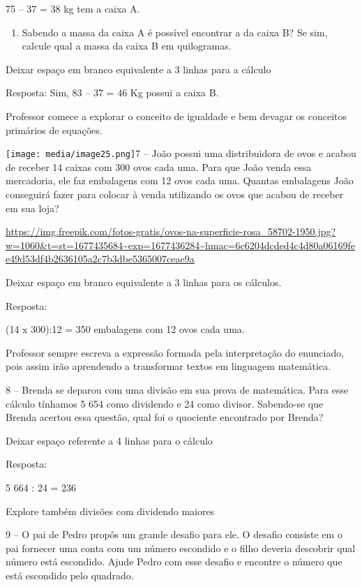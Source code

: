 75 -- 37 = 38 kg tem a caixa A.

\begin{enumerate}
\def\labelenumi{\alph{enumi})}
\item
  Sabendo a massa da caixa A é possível encontrar a da caixa B? Se sim,
  calcule qual a massa da caixa B em quilogramas.
\end{enumerate}

Deixar espaço em branco equivalente a 3 linhas para a cálculo

Resposta: Sim, 83 -- 37 = 46 Kg possui a caixa B.

Professor comece a explorar o conceito de igualdade e bem devagar os
conceitos primários de equações.

\texttt{[image: media/image25.png]}7
-- João possui uma distribuidora de ovos e acabou de receber 14 caixas
com 300 ovos cada uma. Para que João venda essa mercadoria, ele faz
embalagens com 12 ovos cada uma. Quantas embalagens João conseguirá
fazer para colocar à venda utilizando os ovos que acabou de receber em
sua loja?

\url{https://img.freepik.com/fotos-gratis/ovos-na-superficie-rosa_58702-1950.jpg?w=1060\&t=st=1677435684~exp=1677436284~hmac=6c6204dcded4c4d80a06169fee49d53df4b2636105a2c7b3dbe5365007ceae9a}

Deixar espaço em branco equivalente a 3 linhas para os cálculos.

Resposta:

(14 x 300):12 = 350 embalagens com 12 ovos cada uma.

Professor sempre escreva a expressão formada pela interpretação do
enunciado, pois assim irão aprendendo a transformar textos em linguagem
matemática.

8 -- Brenda se deparou com uma divisão em sua prova de matemática. Para
esse cálculo tínhamos 5 654 como dividendo e 24 como divisor. Sabendo-se
que Brenda acertou essa questão, qual foi o quociente encontrado por
Brenda?

Deixar espaço referente a 4 linhas para o cálculo

Resposta:

5 664 : 24 = 236

Explore também divisões com dividendo maiores

9 -- O pai de Pedro propôs um grande desafio para ele. O desafio
consiste em o pai fornecer uma conta com um número escondido e o filho
deveria descobrir qual número está escondido. Ajude Pedro com esse
desafio e encontre o número que está escondido pelo quadrado.

